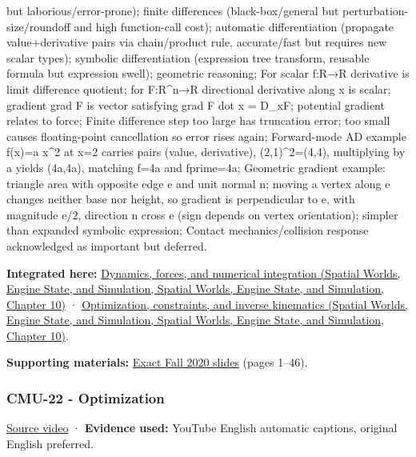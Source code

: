 but laborious/error-prone); finite differences (black-box/general but perturbation-size/roundoff and high function-call cost); automatic differentiation (propagate value+derivative pairs via chain/product rule, accurate/fast but requires new scalar types); symbolic differentiation (expression tree transform, reusable formula but expression swell); geometric reasoning; For scalar f:R→R derivative is limit difference quotient; for F:R\^{}n→R directional derivative along x is scalar; gradient grad F is vector satisfying grad F dot x = D\_xF; potential gradient relates to force; Finite difference step too large has truncation error; too small causes floating-point cancellation so error rises again; Forward-mode AD example f(x)=a x\^{}2 at x=2 carries pairs (value, derivative), (2,1)\^{}2=(4,4), multiplying by a yields (4a,4a), matching f=4a and fprime=4a; Geometric gradient example: triangle area with opposite edge e and unit normal n; moving a vertex along e changes neither base nor height, so gradient is perpendicular to e, with magnitude \textbar e\textbar/2, direction n cross e (sign depends on vertex orientation); simpler than expanded symbolic expression; Contact mechanics/collision response acknowledged as important but deferred.

\textbf{Integrated here:} \href{../05-Spatial-Worlds-Engine-State-and-Simulation/main.pdf\#nameddest=04-visual-computing-ii-ch029-dynamics-forces-and-numerical-integration}{Dynamics, forces, and numerical integration (Spatial Worlds, Engine State, and Simulation, Spatial Worlds, Engine State, and Simulation, Chapter 10)} · \href{../05-Spatial-Worlds-Engine-State-and-Simulation/main.pdf\#nameddest=04-visual-computing-ii-ch029-optimization-constraints-and-inverse-kinematics}{Optimization, constraints, and inverse kinematics (Spatial Worlds, Engine State, and Simulation, Spatial Worlds, Engine State, and Simulation, Chapter 10)}.

\textbf{Supporting materials:} \href{https://15462.courses.cs.cmu.edu/fall2020content/lectures/21_dynamicstimeintegration/21_dynamicstimeintegration_slides.pdf}{Exact Fall 2020 slides} (pages 1--46).

\subsubsection{CMU-22 - Optimization}\label{04-visual-computing-ii-ch036-cmu-22---optimization}

\href{https://www.youtube.com/watch?v=sDAEFFoiKZ0}{Source video} · \textbf{Evidence used:} YouTube English automatic captions, original English preferred.

